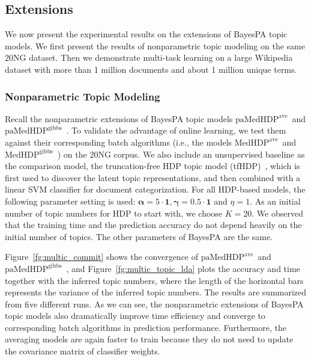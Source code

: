 \documentclass[twoside,11pt]{article}
\newcommand{\alphav}{\bm \alpha}
\newcommand{\gammav}{\bm \gamma}
\newcommand\paMedHDPave{$\text{paMedHDP}^{\text{ave}}$~}
\newcommand\paMedHDPgibbs{$\text{paMedHDP}^{\text{gibbs}}$~}
\newcommand\MedHDPave{$\text{MedHDP}^{\text{ave}}$~}
\newcommand\MedHDPgibbs{$\text{MedHDP}^{\text{gibbs}}$~}
\newcommand{\strin}[1]{\todo[size=\small, color=green!40]{\bf\sf  #1}}
\newcommand{\jun}[1]{\marginpar{\color{blue}\tiny{Jun: #1}}}
\begin{document}
\subsection{Extensions}

We now present the experimental results on the extensions of BayesPA topic models. We first present the results of nonparametric topic modeling on the same 20NG dataset. Then we demonstrate multi-task learning on a large Wikipedia dataset with more than 1 million documents and about 1 million unique terms.





\subsubsection{Nonparametric Topic Modeling}

Recall the nonparametric extensions of BayesPA topic models \paMedHDPave and \paMedHDPgibbs. To validate the advantage of online learning, we test them against their corresponding batch algorithms (i.e., the models \MedHDPave and \MedHDPgibbs) on the 20NG corpus. We also include an unsupervised baseline as the comparison model, the truncation-free HDP topic model (tfHDP)~\citep{wang2012truncation}, which is first used to discover the latent topic representations, and then combined with a linear SVM classifier for document categorization. For all HDP-based models, the following parameter setting is used: $\alphav = 5 \cdot \bm{1}, \gammav = 0.5 \cdot \bm{1}$ and $\eta = 1$. As an initial number of topic numbers for HDP to start with, we choose $K = 20$. We observed that the training time and the prediction accuracy do not depend heavily on the initial number of topics. The other parameters of BayesPA are the same.


Figure~\ref{fg:multic_commit} shows the convergence of \paMedHDPave and \paMedHDPgibbs, and Figure~\ref{fg:multic_topic_lda} plots the accuracy and time together with the inferred topic numbers, where the length of the horizontal bars represents the variance of the inferred topic numbers. The results are summarized from five different runs. As we can see, the nonparametric extensions of BayesPA topic models also dramatically improve time efficiency and converge to corresponding batch algorithms  in prediction performance. Furthermore, the averaging models are again faster to train because they do not need to update the covariance matrix of classifier weights.
\end{document}
